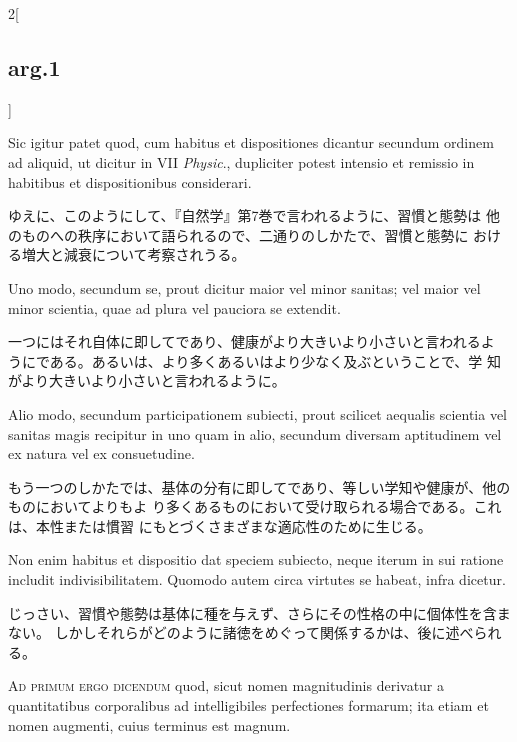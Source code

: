 \documentclass[paper=a4paper,fontsize=10pt,jafontsize=9pt,titlepage]{jlreq}
\begin{document}
\begin{paracol}{2}[\subsection{arg.1}]
\switchcolumn*

Sic igitur patet quod, cum habitus et dispositiones
dicantur secundum ordinem ad aliquid, ut dicitur in VII {\itshape Physic}.,
dupliciter potest intensio et remissio in habitibus et dispositionibus
considerari.

\switchcolumn

ゆえに、このようにして、『自然学』第7巻で言われるように、習慣と態勢は
他のものへの秩序において語られるので、二通りのしかたで、習慣と態勢に
おける増大と減衰について考察されうる。

\switchcolumn*

Uno modo, secundum se, prout dicitur maior vel minor
sanitas; vel maior vel minor scientia, quae ad plura vel pauciora se
extendit.

\switchcolumn

一つにはそれ自体に即してであり、健康がより大きいより小さいと言われるよ
 うにである。あるいは、より多くあるいはより少なく及ぶということで、学
 知がより大きいより小さいと言われるように。

\switchcolumn*

Alio modo, secundum participationem subiecti, prout scilicet
aequalis scientia vel sanitas magis recipitur in uno quam in alio,
secundum diversam aptitudinem vel ex natura vel ex consuetudine.

\switchcolumn

もう一つのしかたでは、基体の分有に即してであり、等しい学知や健康が、他のものにおいてよりもよ
 り多くあるものにおいて受け取られる場合である。これは、本性または慣習
 にもとづくさまざまな適応性のために生じる。

\switchcolumn*

Non
enim habitus et dispositio dat speciem subiecto, neque iterum in sui
ratione includit indivisibilitatem. Quomodo autem circa virtutes se
habeat, infra dicetur.

\switchcolumn

じっさい、習慣や態勢は基体に種を与えず、さらにその性格の中に個体性を含まない。
しかしそれらがどのように諸徳をめぐって関係するかは、後に述べられる。

\switchcolumn*[\subsection{ad.1}]

{\scshape Ad primum ergo dicendum} quod, sicut nomen magnitudinis derivatur a
quantitatibus corporalibus ad intelligibiles perfectiones formarum;
ita etiam et nomen augmenti, cuius terminus est magnum.


\end{paracol}
\end{document}
